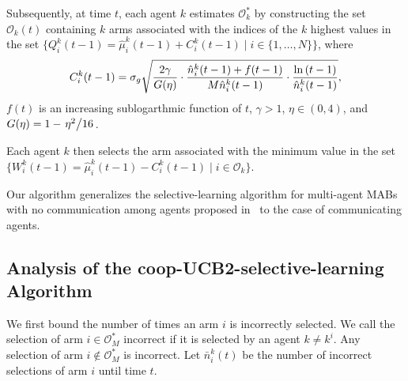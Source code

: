 \documentclass[final,5p,times,twocolumn]{elsarticle}
\theoremstyle{definition}
\def \mc {\mathcal}
\newcommand{\until}[1]{\{1,\dots, #1\}}
\newcommand{\setdef}[2]{\{#1 \; | \; #2\}}
\newcommand{\slfrac}[2]{\left.#1\middle/#2\right.}
\newcommand{\lnn}[1]{%
	\ln  \left(#1\right)%
}
\begin{document}
 Subsequently, at time $t$, each agent $k$ estimates $\mc O_k^*$ by constructing the set $\mathcal{O}_{k}(t)$ containing $k$ arms associated with the indices of the $k$ highest values in the set $\setdef{Q_i^{k}(t-1) = \hat{\mu}_i^{k}(t-1) + C_i^k(t-1)}{i \in \until{N}}$, where
\begin{equation}
C_i^k(t-1) =  \sigma_g \;\sqrt[]{\frac{2\gamma}{G(\eta)} \cdot \frac{\hat{n}_i^{k}(t-1) +  f(t-1)}{M\hat{n}_i^{k}(t-1)}\cdot\frac{ \lnn{t-1}}{\hat{n}_i^{k}(t-1)}}, \label{C2defn-bounded-col}
\end{equation}
 $f(t)$ is an increasing sublogarthmic function of $t$, $\gamma>1$, $\eta \in (0,4)$, and $G(\eta) = 1-\slfrac{\eta^2}{16}$. 

Each agent $k$ then selects the arm associated  with the minimum value in the set $\setdef{W_i^{k}(t-1) = \hat{\mu}_i^{k}(t-1) - C_i^k(t-1)}{i \in \mc O_k}$. 

Our algorithm generalizes the selective-learning algorithm for multi-agent MABs with no communication among agents proposed in~\cite{gai2014distributed} to the case of communicating agents. 


\subsection{Analysis of the coop-UCB2-selective-learning Algorithm}
We first bound the number of times an arm $i$ is incorrectly selected. We call the selection of arm $i \in \mc O_M^*$ incorrect if it is selected by an agent $k \ne k^i$. Any selection of arm  $i \notin \mc O_M^*$ is incorrect. Let $\bar n_i^k(t)$ be the number of incorrect selections of arm $i$ until time $t$. 
\end{document}
